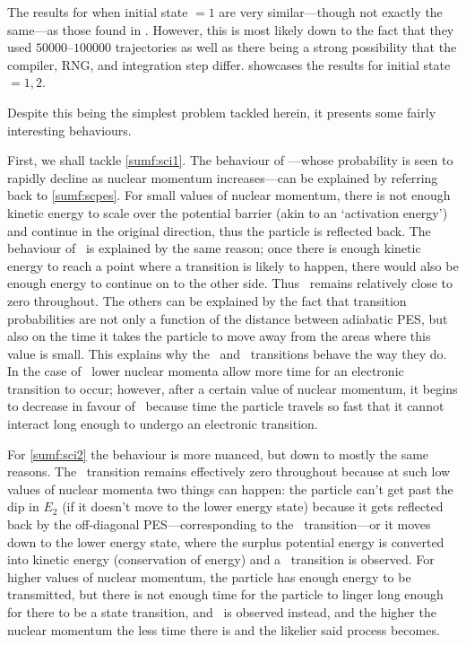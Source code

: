 The results for when initial state $ = 1 $ are very similar---though not exactly the same---as those found in \cite{project}. However, this is most likely down to the fact that they used $ 50000\text{--}100000$ trajectories as well as there being a strong possibility that the compiler, RNG, and integration step differ.  showcases the results for initial state $ = 1, 2 $.

Despite this being the simplest problem tackled herein, it presents some fairly interesting behaviours.

First, we shall tackle \cref{sumf:sci1}. The behaviour of \roo---whose probability is seen to rapidly decline as nuclear momentum increases---can be explained by referring back to \cref{sumf:scpes}. For small values of nuclear momentum, there is not enough kinetic energy to scale over the potential barrier (akin to an `activation energy') and continue in the original direction, thus the particle is reflected back. The behaviour of \rto~is explained by the same reason; once there is enough kinetic energy to reach a point where a transition is likely to happen, there would also be enough energy to continue on to the other side. Thus \rto~remains relatively close to zero throughout. The others can be explained by the fact that transition probabilities are not only a function of the distance between adiabatic PES, but also on the time it takes the particle to move away from the areas where this value is small. This explains why the \tto~and \too~transitions behave the way they do. In the case of \tto~lower nuclear momenta allow more time for an electronic transition to occur; however, after a certain value of nuclear momentum, it begins to decrease in favour of \too~because time the particle travels so fast that it cannot interact long enough to undergo an electronic transition.

For \cref{sumf:sci2} the behaviour is more nuanced, but down to mostly the same reasons. The \rot~transition remains effectively zero throughout because at such low values of nuclear momenta two things can happen: the particle can't get past the dip in $ E_{2} $ (if it doesn't move to the lower energy state) because it gets reflected back by the off-diagonal PES---corresponding to the \rtt~transition---or it moves down to the lower energy state, where the surplus potential energy is converted into kinetic energy (conservation of energy) and a \tot~transition is observed. For higher values of nuclear momentum, the particle has enough energy to be transmitted, but there is not enough time for the particle to linger long enough for there to be a state transition, and \ttt~is observed instead, and the higher the nuclear momentum the less time there is and the likelier said process becomes.
%
